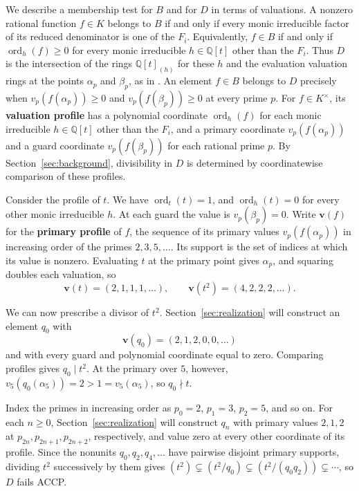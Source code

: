 \documentclass{article}
\DeclareMathOperator{\ord}{ord}
\theoremstyle{remark}
\begin{document}
We describe a membership test for $B$ and for $D$ in terms of valuations.
A nonzero rational function $f \in K$ belongs to $B$ if and only if every monic irreducible factor of its reduced denominator is one of the $F_i$.
Equivalently, $f \in B$ if and only if $\ord_h(f) \ge 0$ for every monic irreducible $h \in \mathbb{Q}[t]$ other than the $F_i$.
Thus $D$ is the intersection of the rings $\mathbb{Q}[t]_{(h)}$ for these $h$ and the evaluation valuation rings at the points $\alpha_p$ and $\beta_p$, as in \cite[\S4]{CPOverrings}.
An element $f \in B$ belongs to $D$ precisely when $v_p(f(\alpha_p)) \ge 0$ and $v_p(f(\beta_p)) \ge 0$ at every prime $p$.
For $f \in K^\times$, its \textbf{valuation profile} has a polynomial coordinate $\ord_h(f)$ for each monic irreducible $h \in \mathbb{Q}[t]$ other than the $F_i$, and a primary coordinate $v_p(f(\alpha_p))$ and a guard coordinate $v_p(f(\beta_p))$ for each rational prime $p$.
By Section~\ref{sec:background}, divisibility in $D$ is determined by coordinatewise comparison of these profiles.

Consider the profile of $t$.
We have $\operatorname{ord}_t(t) = 1$, and $\operatorname{ord}_h(t) = 0$ for every other monic irreducible $h$.
At each guard the value is $v_p(\beta_p) = 0$.
Write $\mathbf{v}(f)$ for the \textbf{primary profile} of $f$, the sequence of its primary values $v_p(f(\alpha_p))$ in increasing order of the primes $2, 3, 5, \ldots$.
Its support is the set of indices at which its value is nonzero.
Evaluating $t$ at the primary point gives $\alpha_p$, and squaring doubles each valuation, so
\[
    \mathbf{v}(t) = (2, 1, 1, 1, \ldots),
    \qquad
    \mathbf{v}(t^2) = (4, 2, 2, 2, \ldots).
\]

We can now prescribe a divisor of $t^2$.
Section~\ref{sec:realization} will construct an element $q_0$ with
\[
    \mathbf{v}(q_0) = (2, 1, 2, 0, 0, \ldots)
\]
and with every guard and polynomial coordinate equal to zero.
Comparing profiles gives $q_0 \mid t^2$.
At the primary over $5$, however, $v_5(q_0(\alpha_5)) = 2 > 1 = v_5(\alpha_5)$, so $q_0 \nmid t$.

Index the primes in increasing order as $p_0 = 2$, $p_1 = 3$, $p_2 = 5$, and so on.
For each $n \ge 0$, Section~\ref{sec:realization} will construct $q_n$ with primary values $2, 1, 2$ at $p_{2n}, p_{2n + 1}, p_{2n + 2}$, respectively, and value zero at every other coordinate of its profile.
Since the nonunits $q_0, q_2, q_4, \ldots$ have pairwise disjoint primary supports, dividing $t^2$ successively by them gives $(t^2) \subsetneq (t^2/q_0) \subsetneq (t^2/(q_0 q_2)) \subsetneq \cdots$, so $D$ fails ACCP.
\end{document}
